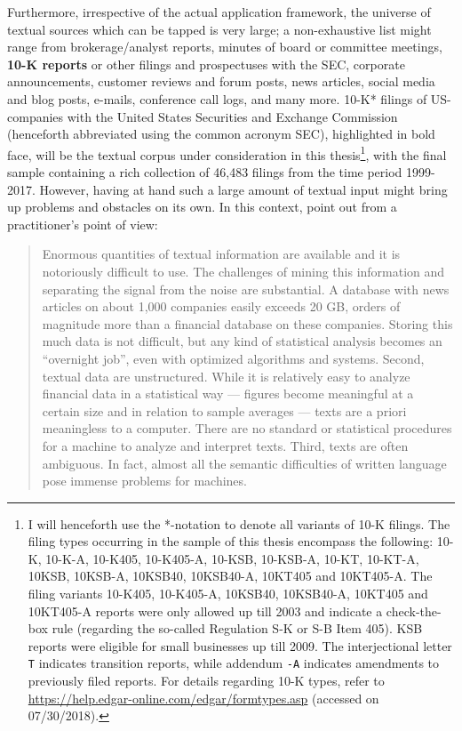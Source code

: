 Furthermore, irrespective of the actual application framework, the universe of textual sources which can be tapped is very large; a non-exhaustive list might range from brokerage/analyst reports, minutes of board or committee meetings, \textbf{10-K reports} or other filings and prospectuses with the SEC, corporate announcements, customer reviews and forum posts, news articles, social media and blog posts, e-mails, conference call logs, and many more. 10-K* filings of US-companies with the United States Securities and Exchange Commission (henceforth abbreviated using the common acronym SEC), highlighted in bold face, will be the textual corpus under consideration in this thesis\footnote{\label{fn: 10K-def}I will henceforth use the *-notation to denote all variants of 10-K filings. The filing types occurring in the sample of this thesis encompass the following: 10-K, 10-K-A, 10-K405, 10-K405-A, 10-KSB, 10-KSB-A, 10-KT, 10-KT-A, 10KSB, 10KSB-A, 10KSB40, 10KSB40-A, 10KT405 and 10KT405-A. The filing variants 10-K405, 10-K405-A, 10KSB40, 10KSB40-A, 10KT405 and 10KT405-A reports were only allowed up till 2003 and indicate a check-the-box rule (regarding the so-called Regulation S-K or S-B Item 405). KSB reports were eligible for small businesses up till 2009. The interjectional letter \texttt{T} indicates transition reports, while addendum \texttt{-A} indicates amendments to previously filed reports. For details regarding 10-K types, refer to \url{https://help.edgar-online.com/edgar/formtypes.asp} (accessed on 07/30/2018).}, with the final sample containing a rich collection of 46,483 filings from the time period 1999-2017. However, having at hand such a large amount of textual input might bring up problems and obstacles on its own. In this context, \textcite{McKinsey_2013} point out from a practitioner's point of view:
\blockquote{Enormous quantities of textual information are available \textelp{} and it is notoriously difficult to use. \textelp{} The challenges of mining this information and separating the signal from the noise are substantial. \textelp{} A database with news articles on about 1,000 companies easily exceeds 20 GB, orders of magnitude more than a financial database on these companies. Storing this much data is not difficult, but any kind of statistical analysis becomes an \enquote{overnight job}, even with optimized algorithms and systems. \textelp{} Second, textual data are unstructured. While it is relatively easy to analyze financial data in a statistical way — figures become meaningful at a certain size and in relation to sample averages — texts are a priori meaningless to a computer. There are no standard or statistical procedures for a machine to analyze and interpret texts. \textelp{} Third, texts are often ambiguous. \textelp{} In fact, almost all the semantic difficulties of written language pose immense problems for machines.} 

